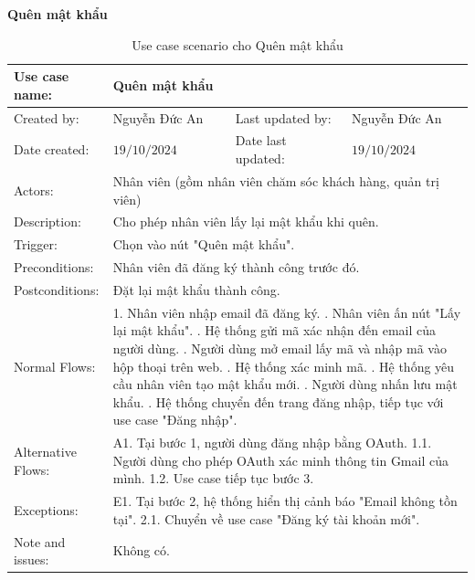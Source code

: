 \textbf{Quên mật khẩu}
\begin{table}[H]
	\centering
	\begin{tabular}{|l|l|l|l|} 
		\hline Use case name: & \multicolumn{3}{|l|}{Quên mật khẩu} \\ 
		\hline Created by: & Nguyễn Đức An & Last updated by: & Nguyễn Đức An \\ 
		\hline Date created: & $19 / 10 / 2024$ & Date last updated: & $19 / 10 / 2024$\\ 
		\hline Actors: & \multicolumn{3}{|l|}{ Nhân viên (gồm nhân viên chăm sóc khách hàng, quản trị viên) } \\ 
		\hline Description: & \multicolumn{3}{|p{12cm}|}{ Cho phép nhân viên lấy lại mật khẩu khi quên. } \\ 
		\hline Trigger: & \multicolumn{3}{|p{12cm}|}{ Chọn vào nút "Quên mật khẩu". } \\ 
		\hline Preconditions: & \multicolumn{3}{|p{12cm}|}{ Nhân viên đã đăng ký thành công trước đó. } \\ 
		\hline Postconditions: & \multicolumn{3}{|p{12cm}|}{ Đặt lại mật khẩu thành công. } \\ 
		\hline Normal Flows: & \multicolumn{3}{|p{12cm}|}{ 
			1. Nhân viên nhập email đã đăng ký. \newline 
			2. Nhân viên ấn nút "Lấy lại mật khẩu". \newline 
			3. Hệ thống gửi mã xác nhận đến email của người dùng. \newline 
			4. Người dùng mở email lấy mã và nhập mã vào hộp thoại trên web. \newline 
			5. Hệ thống xác minh mã. \newline 
			6. Hệ thống yêu cầu nhân viên tạo mật khẩu mới. \newline 
			7. Người dùng nhấn lưu mật khẩu. \newline 
			8. Hệ thống chuyển đến trang đăng nhập, tiếp tục với use case "Đăng nhập". 
		} \\ 
		\hline Alternative Flows: & \multicolumn{3}{|p{12cm}|}{ 
			A1. Tại bước 1, người dùng đăng nhập bằng OAuth. \newline 
			\hspace{0.5cm}1.1. Người dùng cho phép OAuth xác minh thông tin Gmail của mình. \newline 
			\hspace{0.5cm}1.2. Use case tiếp tục bước 3. 
		} \\ 
		\hline Exceptions: & \multicolumn{3}{|p{12cm}|}{ 
			E1. Tại bước 2, hệ thống hiển thị cảnh báo "Email không tồn tại". \newline 
			\hspace{0.5cm}2.1. Chuyển về use case "Đăng ký tài khoản mới". 
		} \\ 
		\hline Note and issues: & \multicolumn{3}{|p{12cm}|}{ Không có. } \\ 
		\hline
	\end{tabular}
	\caption{Use case scenario cho Quên mật khẩu}
\end{table}

